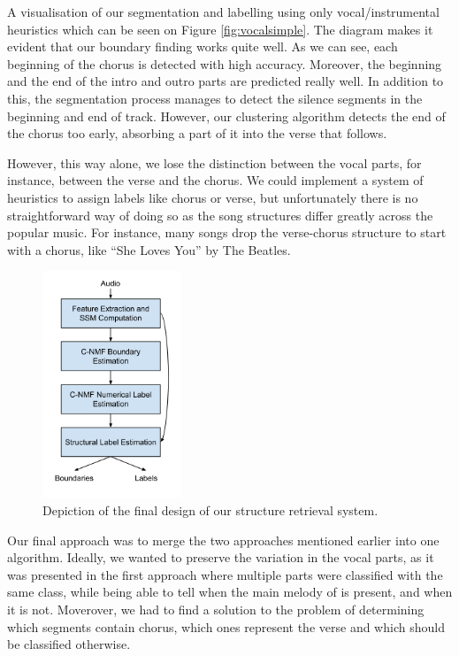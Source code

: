 A visualisation of our segmentation and labelling using only vocal/instrumental heuristics which can be seen on Figure \ref{fig:vocalsimple}. The diagram makes it evident that our boundary finding works quite well. As we can see, each beginning of the chorus is detected with high accuracy. Moreover, the beginning and the end of the intro and outro parts are predicted really well. In addition to this, the segmentation process manages to detect the silence segments in the beginning and end of track. However, our clustering algorithm detects the end of the chorus too early, absorbing a part of it into the verse that follows.

However, this way alone, we lose the distinction between the vocal parts, for instance, between the verse and the chorus. We could implement a system of heuristics to assign labels like chorus or verse, but unfortunately there is no straightforward way of doing so as the song structures differ greatly across the popular music. For instance, many songs drop the verse-chorus structure to start with a chorus, like ``She Loves You'' by The Beatles.

\begin{figure}
\vspace{-20pt}
  \begin{center}
    \includegraphics[width=0.37\textwidth]{Figures/structureretrieval}
  \end{center}
  \caption{Depiction of the final design of our structure retrieval system.}
\label{fig:NMF}
\end{figure}

Our final approach was to merge the two approaches mentioned earlier into one algorithm. Ideally, we wanted to preserve the variation in the vocal parts, as it was presented in the first approach where multiple parts were classified with the same class, while being able to tell when the main melody of is present, and when it is not. Moverover, we had to find a solution to the problem of determining which segments contain chorus, which ones represent the verse and which should be classified otherwise.

